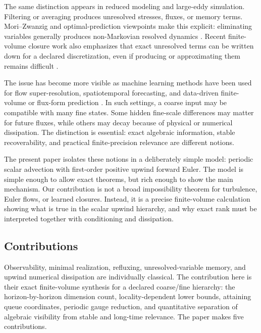 \documentclass[preprint,12pt]{elsarticle}
\theoremstyle{plain}
\theoremstyle{remark}
\theoremstyle{definition}
\begin{document}
The same distinction appears in reduced modeling and large-eddy simulation.
Filtering or averaging produces unresolved stresses, fluxes, or memory
terms.  Mori--Zwanzig \cite{mori1965,zwanzig1961} and optimal-prediction viewpoints make this explicit:
eliminating variables generally produces non-Markovian resolved dynamics
\cite{ChorinHaldKupferman:2002memory,ParishDuraisamy:2017nonmarkovian,
GouasmiParishDuraisamy:2017memory,LinTianLivescuAnghel:2021mzlearning}.
Recent finite-volume closure work also emphasizes that exact unresolved
terms can be written down for a declared discretization, even if producing or
approximating them remains difficult \cite{Agdestein:2026exactfvclosure}.

The issue has become more visible as machine learning methods have been used
for flow super-resolution, spatiotemporal forecasting, and data-driven
finite-volume or flux-form prediction
\cite{DuraisamyIaccarinoXiao:2019data,KarniadakisEtAl:2021piml,
VinuesaBrunton:2022cfdml,BarSinai:2019datadriven,KochkovEtAl:2021mlcfd,
ZhuangEtAl:2021learnedadvection,deRomemontEtAl:2026learnedfv,
Gao:2021physicsinformed,Gao:2023bayesian,
Sofos:2025spatiotemporal,
Liu:2026entropyCFN,Charles:2025dspweno}.  In such settings, a coarse input
may be compatible with many fine states.  Some hidden fine-scale differences
may matter for future fluxes, while others may decay because of physical or
numerical dissipation.  The distinction is essential: exact algebraic
information, stable recoverability, and practical finite-precision relevance
are different notions.

The present paper isolates these notions in a deliberately simple model:
periodic scalar advection with first-order positive upwind forward Euler.
The model is simple enough to allow exact theorems, but rich enough to show
the main mechanism.  Our contribution is not a broad impossibility theorem
for turbulence, Euler flows, or learned closures.  Instead, it is a precise
finite-volume calculation showing what is true in the scalar upwind
hierarchy, and why exact rank must be interpreted together with conditioning
and dissipation.

\subsection{Contributions}

Observability, minimal realization, refluxing, unresolved-variable memory,
and upwind numerical dissipation are individually classical.  The
contribution here is their exact finite-volume synthesis for a declared
coarse/fine hierarchy: the horizon-by-horizon dimension count,
locality-dependent lower bounds, attaining queue coordinates, periodic gauge
reduction, and quantitative separation of algebraic visibility from stable
and long-time relevance. The paper makes five contributions.
\end{document}
